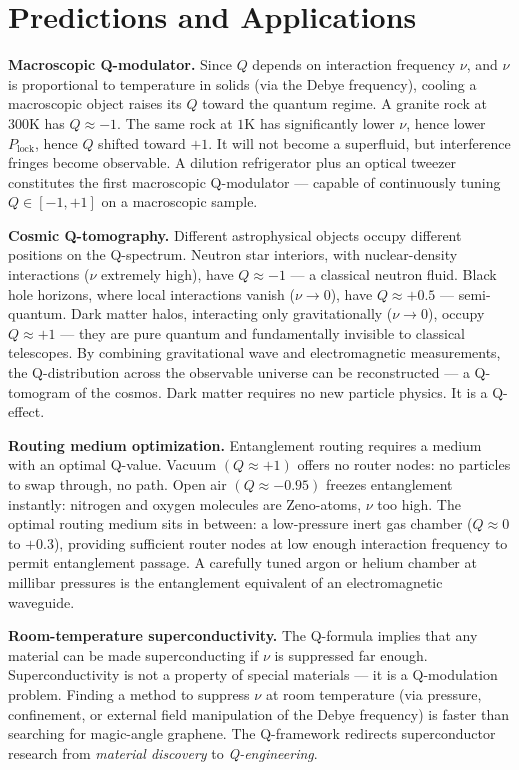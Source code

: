 \documentclass[12pt]{article}
\begin{document}
\section{Predictions and Applications}

\textbf{Macroscopic Q-modulator.} Since $Q$ depends on interaction frequency $\nu$, and $\nu$ is proportional to temperature in solids (via the Debye frequency), cooling a macroscopic object raises its $Q$ toward the quantum regime. A granite rock at $300\text{K}$ has $Q \approx -1$. The same rock at $1\text{K}$ has significantly lower $\nu$, hence lower $P_{\text{lock}}$, hence $Q$ shifted toward $+1$. It will not become a superfluid, but interference fringes become observable. A dilution refrigerator plus an optical tweezer constitutes the first macroscopic Q-modulator — capable of continuously tuning $Q \in [-1, +1]$ on a macroscopic sample.

\textbf{Cosmic Q-tomography.} Different astrophysical objects occupy different positions on the Q-spectrum. Neutron star interiors, with nuclear-density interactions ($\nu$ extremely high), have $Q \approx -1$ — a classical neutron fluid. Black hole horizons, where local interactions vanish ($\nu \to 0$), have $Q \approx +0.5$ — semi-quantum. Dark matter halos, interacting only gravitationally ($\nu \to 0$), occupy $Q \approx +1$ — they are pure quantum and fundamentally invisible to classical telescopes. By combining gravitational wave and electromagnetic measurements, the Q-distribution across the observable universe can be reconstructed — a Q-tomogram of the cosmos. Dark matter requires no new particle physics. It is a Q-effect.

\textbf{Routing medium optimization.} Entanglement routing requires a medium with an optimal Q-value. Vacuum $(Q \approx +1)$ offers no router nodes: no particles to swap through, no path. Open air $(Q \approx -0.95)$ freezes entanglement instantly: nitrogen and oxygen molecules are Zeno-atoms, $\nu$ too high. The optimal routing medium sits in between: a low-pressure inert gas chamber ($Q \approx 0$ to $+0.3$), providing sufficient router nodes at low enough interaction frequency to permit entanglement passage. A carefully tuned argon or helium chamber at millibar pressures is the entanglement equivalent of an electromagnetic waveguide.

\textbf{Room-temperature superconductivity.} The Q-formula implies that any material can be made superconducting if $\nu$ is suppressed far enough. Superconductivity is not a property of special materials — it is a Q-modulation problem. Finding a method to suppress $\nu$ at room temperature (via pressure, confinement, or external field manipulation of the Debye frequency) is faster than searching for magic-angle graphene. The Q-framework redirects superconductor research from \textit{material discovery} to \textit{Q-engineering}.
\end{document}
